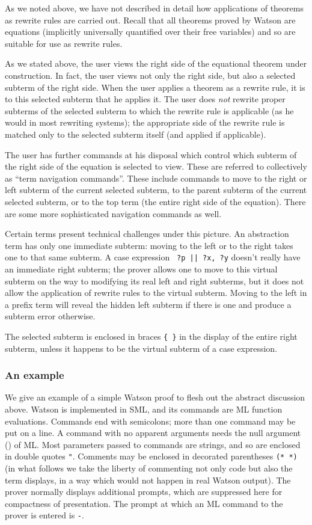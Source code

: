 \documentclass{kluwer}
\begin{document}
\begin{article}
As we noted above, we have not described in detail how applications of
theorems as rewrite rules are carried out.  Recall that all theorems proved
by Watson are equations (implicitly universally quantified over their
free variables) and so are suitable for use as rewrite rules.

As we stated above, the user views the right side of the equational
theorem under construction.  In fact, the user views not only the
right side, but also a selected subterm of the right side.  When the
user applies a theorem as a rewrite rule, it is to this selected
subterm that he applies it.  The user does {\em not\/} rewrite proper
subterms of the selected subterm to which the rewrite rule is
applicable (as he would in most rewriting systems); the
appropriate side of the rewrite rule is matched only to the selected
subterm itself (and applied if applicable).

The user has further commands at his disposal which control which
subterm of the right side of the equation is selected to view.  These
are referred to collectively as ``term navigation commands''.  These
include commands to move to the right or left subterm of the current
selected subterm, to the parent subterm of the current selected
subterm, or to the top term (the entire right side of the equation).
There are some more sophisticated navigation commands as well.

Certain terms present technical challenges under this picture.  An
abstraction term has only one immediate subterm: moving to the left or
to the right takes one to that same subterm.  A case expression {\tt
?p || ?x, ?y} doesn't really have an immediate right subterm; the
prover allows one to move to this virtual subterm on the way to
modifying its real left and right subterms, but it does not allow the
application of rewrite rules to the virtual subterm.  Moving to the
left in a prefix term will reveal the hidden left subterm if there is
one and produce a subterm error otherwise.

The selected subterm is enclosed in braces {\tt \{\,\}} in the display of
the entire right subterm, unless it happens to be the virtual subterm of
a case expression.

\subsubsection {An example}

We give an example of a simple Watson proof to flesh out the abstract
discussion above.  Watson is implemented in SML, and its commands are
ML function evaluations.  Commands end with semicolons; more than one
command may be put on a line.  A command with no apparent arguments
needs the null argument () of ML.  Most parameters passed to commands
are strings, and so are enclosed in double quotes {\tt "}.  Comments
may be enclosed in decorated parentheses {\tt (* *)} (in what follows
we take the liberty of commenting not only code but also the term
displays, in a way which would not happen in real Watson output).  The
prover normally displays additional prompts, which are suppressed here
for compactness of presentation.  The prompt at which an ML command to
the prover is entered is {\tt -}.


\end{article}
\end{document}
